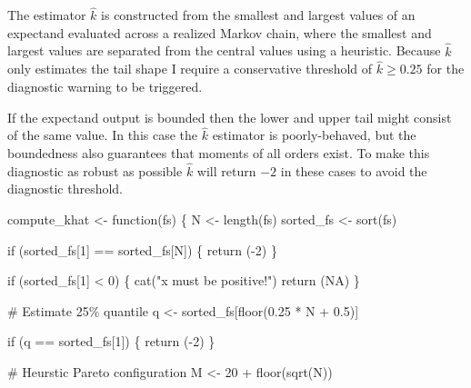 \documentclass[
  letterpaper,
  DIV=11,
  numbers=noendperiod]{scrartcl}
\newenvironment{Shaded}{\begin{snugshade}}{\end{snugshade}}
\newcommand{\CommentTok}[1]{\textcolor[rgb]{0.37,0.37,0.37}{#1}}
\newcommand{\ConstantTok}[1]{\textcolor[rgb]{0.56,0.35,0.01}{#1}}
\newcommand{\ControlFlowTok}[1]{\textcolor[rgb]{0.00,0.23,0.31}{#1}}
\newcommand{\DecValTok}[1]{\textcolor[rgb]{0.68,0.00,0.00}{#1}}
\newcommand{\FloatTok}[1]{\textcolor[rgb]{0.68,0.00,0.00}{#1}}
\newcommand{\FunctionTok}[1]{\textcolor[rgb]{0.28,0.35,0.67}{#1}}
\newcommand{\NormalTok}[1]{\textcolor[rgb]{0.00,0.23,0.31}{#1}}
\newcommand{\OtherTok}[1]{\textcolor[rgb]{0.00,0.23,0.31}{#1}}
\newcommand{\SpecialCharTok}[1]{\textcolor[rgb]{0.37,0.37,0.37}{#1}}
\newcommand{\StringTok}[1]{\textcolor[rgb]{0.13,0.47,0.30}{#1}}
\begin{document}
The estimator \(\hat{k}\) is constructed from the smallest and largest
values of an expectand evaluated across a realized Markov chain, where
the smallest and largest values are separated from the central values
using a heuristic. Because \(\hat{k}\) only estimates the tail shape I
require a conservative threshold of \(\hat{k} \ge 0.25\) for the
diagnostic warning to be triggered.

If the expectand output is bounded then the lower and upper tail might
consist of the same value. In this case the \(\hat{k}\) estimator is
poorly-behaved, but the boundedness also guarantees that moments of all
orders exist. To make this diagnostic as robust as possible \(\hat{k}\)
will return \(-2\) in these cases to avoid the diagnostic threshold.

\begin{Shaded}
\begin{Highlighting}[]
\NormalTok{compute\_khat }\OtherTok{\textless{}{-}} \ControlFlowTok{function}\NormalTok{(fs) \{}
\NormalTok{  N }\OtherTok{\textless{}{-}} \FunctionTok{length}\NormalTok{(fs)}
\NormalTok{  sorted\_fs }\OtherTok{\textless{}{-}} \FunctionTok{sort}\NormalTok{(fs)}

  \ControlFlowTok{if}\NormalTok{ (sorted\_fs[}\DecValTok{1}\NormalTok{] }\SpecialCharTok{==}\NormalTok{ sorted\_fs[N]) \{}
    \FunctionTok{return}\NormalTok{ (}\SpecialCharTok{{-}}\DecValTok{2}\NormalTok{)}
\NormalTok{  \}}

  \ControlFlowTok{if}\NormalTok{ (sorted\_fs[}\DecValTok{1}\NormalTok{] }\SpecialCharTok{\textless{}} \DecValTok{0}\NormalTok{) \{}
    \FunctionTok{cat}\NormalTok{(}\StringTok{"x must be positive!"}\NormalTok{)}
    \FunctionTok{return}\NormalTok{ (}\ConstantTok{NA}\NormalTok{)}
\NormalTok{  \}}

  \CommentTok{\# Estimate 25\% quantile}
\NormalTok{  q }\OtherTok{\textless{}{-}}\NormalTok{ sorted\_fs[}\FunctionTok{floor}\NormalTok{(}\FloatTok{0.25} \SpecialCharTok{*}\NormalTok{ N }\SpecialCharTok{+} \FloatTok{0.5}\NormalTok{)]}

  \ControlFlowTok{if}\NormalTok{ (q }\SpecialCharTok{==}\NormalTok{ sorted\_fs[}\DecValTok{1}\NormalTok{]) \{}
    \FunctionTok{return}\NormalTok{ (}\SpecialCharTok{{-}}\DecValTok{2}\NormalTok{)}
\NormalTok{  \}}

  \CommentTok{\# Heurstic Pareto configuration}
\NormalTok{  M }\OtherTok{\textless{}{-}} \DecValTok{20} \SpecialCharTok{+} \FunctionTok{floor}\NormalTok{(}\FunctionTok{sqrt}\NormalTok{(N))}


\end{Highlighting}
\end{Shaded}
\end{document}
